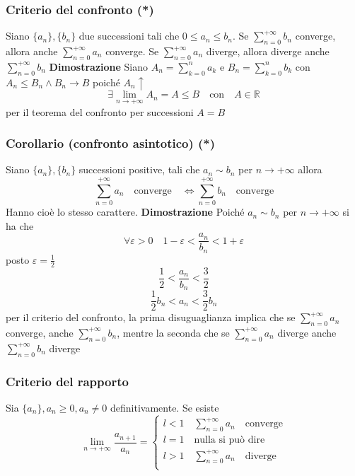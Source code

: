 \documentclass[12pt]{article}
\begin{document}
\subsubsection{Criterio del confronto (*)}
Siano \(\{ a_n \}, \{ b_n \}\) due successioni tali che \(0 \leq a_n \leq b_n\). Se \(\displaystyle \sum_{n=0}^{+\infty} b_n\) converge, allora anche \(\displaystyle \sum_{n=0}^{+\infty} a_n\) converge. Se \(\displaystyle \sum_{n=0}^{+\infty} a_n\) diverge, allora diverge anche \(\displaystyle \sum_{n=0}^{+\infty} b_n\)
\textbf{Dimostrazione}\newline
Siano \(\displaystyle A_n = \sum_{k=0}^{n} a_k\) e \(\displaystyle B_n = \sum_{k=0}^{n} b_k\) con \( A_n \leq B_n \wedge B_n \to B\)
poiché \(A_n \uparrow\)
\[
\exists \lim_{n \to +\infty} A_n = A \leq B \quad \text{con} \quad A \in \mathbb{R}
\]
per il teorema del confronto per successioni \(A=B\)

\subsubsection{Corollario (confronto asintotico) (*)}
Siano \(\{ a_n \}, \{ b_n \}\) successioni positive, tali che \(a_n \sim b_n\)  per \(n \to +\infty\) allora
\[
\sum_{n=0}^{+\infty} a_n \quad \text{converge} \quad \Leftrightarrow \sum_{n=0}^{+\infty} b_n \quad \text{converge}
\]
Hanno cioè lo stesso carattere.
\newpage
\textbf{Dimostrazione}\newline
Poiché \(a_n \sim b_n\)  per \(n \to +\infty\) si ha che
\[
\forall \varepsilon > 0 \quad 1 - \varepsilon < \frac{a_n}{b_n} < 1 + \varepsilon
\]
posto \(\varepsilon = \frac{1}{2}\)
\[
\frac{1}{2} < \frac{a_n}{b_n} < \frac{3}{2}
\]
\[
\frac{1}{2}b_n < a_n< \frac{3}{2}b_n
\]
per il criterio del confronto, la prima disuguaglianza implica che se \(\displaystyle \sum_{n=0}^{+\infty} a_n\) converge, anche \(\displaystyle \sum_{n=0}^{+\infty} b_n\), mentre la seconda che se \(\displaystyle \sum_{n=0}^{+\infty} a_n\) diverge anche \(\displaystyle \sum_{n=0}^{+\infty} b_n\) diverge

\subsubsection{Criterio del rapporto}
Sia \(\{ a_n \}, a_n \geq 0, a_n \neq 0\) definitivamente. Se esiste
\[
\lim_{n \to +\infty} \frac{a_{n+1}}{a_n} = \begin{cases}
l<1 \quad \sum_{n=0}^{+\infty} a_n \quad \text{converge}\\
l=1 \quad \text{nulla si può dire}\\
l>1 \quad \sum_{n=0}^{+\infty} a_n \quad \text{diverge}\\
\end{cases}
\]
\end{document}
